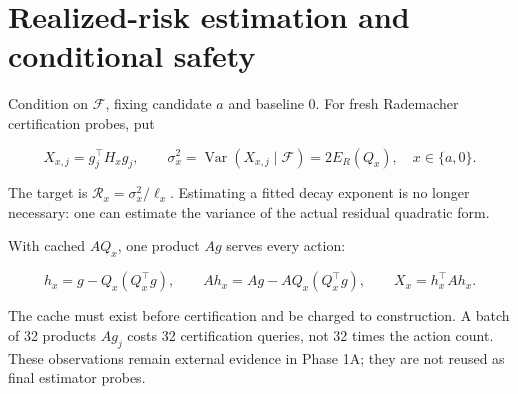 \section{Realized-risk estimation and conditional safety}\label{sec:certification}
Condition on $\mathcal F$, fixing candidate $a$ and baseline $0$. For fresh Rademacher certification probes, put


\begin{equation}
X_{x,j}=g_j^\top H_xg_j,\qquad
\sigma_x^2=\operatorname{Var}(X_{x,j}\mid\mathcal F)=2E_R(Q_x),\quad x\in\{a,0\}.
\end{equation}


The target is $\mathcal R_x=\sigma_x^2/\ell_x$. Estimating a fitted decay exponent is no longer necessary: one can estimate the variance of the actual residual quadratic form.


With cached $AQ_x$, one product $Ag$ serves every action:


\begin{equation}
h_x=g-Q_x(Q_x^\top g),\qquad
Ah_x=Ag-AQ_x(Q_x^\top g),\qquad X_x=h_x^\top Ah_x.
\end{equation}


The cache must exist before certification and be charged to construction. A batch of 32 products $Ag_j$ costs 32 certification queries, not 32 times the action count. These observations remain external evidence in Phase 1A; they are not reused as final estimator probes.


